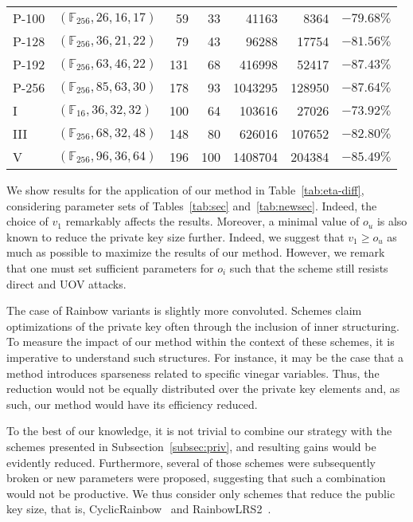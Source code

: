 \documentclass[12pt, a4paper, oneside]{memoir}
\theoremstyle{definition}
\begin{document}
\begin{table}[htbp]
\begin{tabular}{*{2}{l}*{5}{r}}
    P-100 & $(\mathbb{F}_{256}, 26, 16, 17)$ &  59 &  33 & \num{   41163} & \num{   8364} & $-79.68\%$ \\
    P-128 & $(\mathbb{F}_{256}, 36, 21, 22)$ &  79 &  43 & \num{   96288} & \num{  17754} & $-81.56\%$ \\
    P-192 & $(\mathbb{F}_{256}, 63, 46, 22)$ & 131 &  68 & \num{  416998} & \num{  52417} & $-87.43\%$ \\
    P-256 & $(\mathbb{F}_{256}, 85, 63, 30)$ & 178 &  93 & \num{ 1043295} & \num{ 128950} & $-87.64\%$ \\
    I     & $(\mathbb{F}_{ 16}, 36, 32, 32)$ & 100 &  64 & \num{  103616} & \num{  27026} & $-73.92\%$ \\
    III   & $(\mathbb{F}_{256}, 68, 32, 48)$ & 148 &  80 & \num{  626016} & \num{ 107652} & $-82.80\%$ \\
    V     & $(\mathbb{F}_{256}, 96, 36, 64)$ & 196 & 100 & \num{ 1408704} & \num{ 204384} & $-85.49\%$ \\
    \bottomrule
  \end{tabular}
\end{table}

We show results for the application of our method in Table~\ref{tab:eta-diff}, considering parameter sets of Tables~\ref{tab:sec} and~\ref{tab:newsec}. Indeed, the choice of $v_{1}$ remarkably affects the results. Moreover, a minimal value of $o_{u}$ is also known to reduce the private key size further. Indeed, we suggest that $v_{1} \geq o_{u}$ as much as possible to maximize the results of our method. However, we remark that one must set sufficient parameters for $o_{i}$ such that the scheme still resists direct and UOV attacks.

The case of Rainbow variants is slightly more convoluted. Schemes claim optimizations of the private key often through the inclusion of inner structuring. To measure the impact of our method within the context of these schemes, it is imperative to understand such structures. For instance, it may be the case that a method introduces sparseness related to specific vinegar variables. Thus, the reduction would not be equally distributed over the private key elements and, as such, our method would have its efficiency reduced.

To the best of our knowledge, it is not trivial to combine our strategy with the schemes presented in Subsection~\ref{subsec:priv}, and resulting gains would be evidently reduced. Furthermore, several of those schemes were subsequently broken or new parameters were proposed, suggesting that such a combination would not be productive. We thus consider only schemes that reduce the public key size, that is, CyclicRainbow~\cite{Petzoldt:201012} and RainbowLRS2~\cite[Sec.~9.2]{Petzoldt:201307}.
\end{document}
